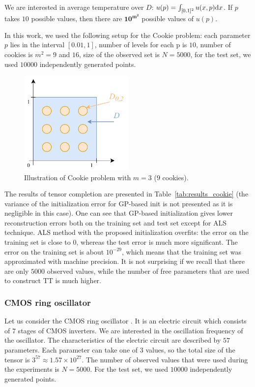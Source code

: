We are interested in average temperature over $D$:
$u(p) = \int_{[0, 1]^2} u(x, p){\rm d}x$.
If $p$ takes $10$ possible values, then there are $\mathbf{10^{m^2}}$
possible values of $u(p)$.

In this work, we used the following setup for the Cookie problem: each parameter $p$ lies in the interval
$[0.01, 1]$,
number of levels for each p is $10$,
number of cookies is $m^2 = 9$ and $16$,
size of the observed set is $N = 5000$,
for the test set, we used $10000$ independently generated points.

\begin{figure}[htbp]
  \centering
  \includegraphics[width=0.5\textwidth]{figures/tensor_completion/CookieProblem.pdf}
  \caption{Illustration of Cookie problem with $m=3$ ($9$ cookies).}
  \label{fig:cookie_problem}
\end{figure}

The results of tensor completion are presented in Table~\ref{tab:results_cookie} (the variance of the initialization error for GP-based init is not presented as it is negligible in this case). One can see that GP-based initialization gives lower reconstruction errors both on the training set and test set except for ALS technique. ALS method with the proposed initialization
overfits: the error on the training set is close to $0$, whereas the test error is much more significant. The error on the training set is about $10^{-29}$, which means that the training set was approximated with machine precision.
It is not surprising if we recall that there are only $5000$ observed values, while the number of free parameters that are used to construct TT is much higher.

\subsubsection{CMOS ring oscillator}
\label{sec:cmos_ring_oscillator}
Let us consider the CMOS ring oscillator \citep{zhang2017big}. It is an electric circuit which consists of $7$ stages of CMOS inverters.
We are interested in the oscillation frequency of the oscillator. The characteristics of the electric circuit are described by $57$ parameters.
Each parameter can take one of $3$ values, so the total size of the tensor is $3^{57} \approx 1.57 \times 10^{27}$. The number of observed values that were used during the experiments is $N = 5000$. For the test set, we used $10000$ independently generated points.

